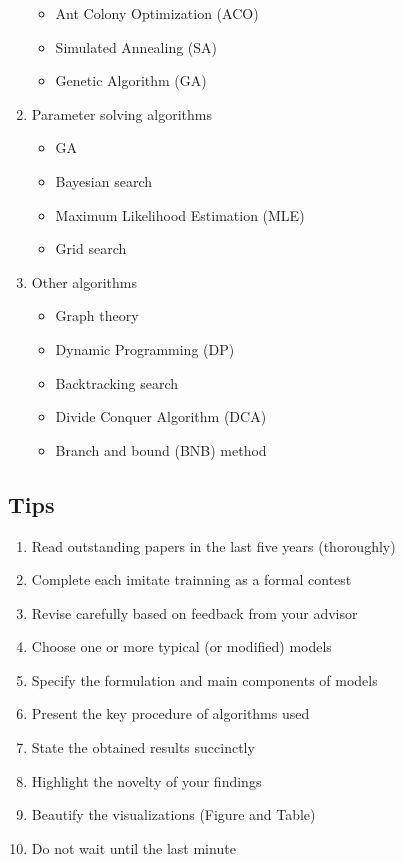 \documentclass[12pt]{article}  %
\begin{document}
\begin{enumerate}[(1)]
\begin{itemize}
     \item Ant Colony Optimization (ACO)
     \item Simulated Annealing (SA)
     \item Genetic Algorithm (GA)
 \end{itemize}
 \item Parameter solving algorithms
 \begin{itemize}
     \setlength{\parsep}{0ex} %
     \setlength{\topsep}{2ex} %
     \setlength{\itemsep}{1ex} %
     \item GA
     \item Bayesian search
     \item Maximum Likelihood Estimation (MLE)
     \item Grid search
 \end{itemize}
 \item Other algorithms
 \begin{itemize}
     \setlength{\parsep}{0ex} %
     \setlength{\topsep}{2ex} %
     \setlength{\itemsep}{1ex} %
     \item Graph theory
     \item Dynamic Programming (DP)
     \item Backtracking search
     \item Divide Conquer Algorithm (DCA)
     \item Branch and bound (BNB) method
 \end{itemize}
 \end{enumerate}
 
 \subsection{Tips}
  
 \begin{enumerate}[(1)]
     \item Read outstanding papers in the last five years (thoroughly)
     \item Complete each imitate trainning as a formal contest
     \item Revise carefully based on feedback from your advisor
     \item Choose one or more typical (or modified) models  
     \item Specify the formulation and main components of models
     \item Present the key procedure of algorithms used
     \item State the obtained results succinctly
     \item Highlight the novelty of your findings
     \item Beautify the visualizations (Figure and Table)
     \item Do not wait until the last minute
 \end{enumerate} 
 
\end{document}
